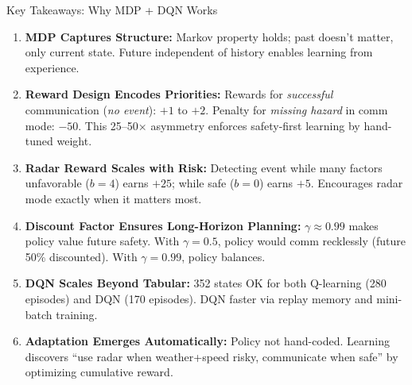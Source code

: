 \documentclass{beamer}
\begin{document}
\begin{frame}{Key Takeaways: Why MDP + DQN Works}
  \begin{enumerate}
    \item \textbf{MDP Captures Structure:} Markov property holds; past doesn't matter, only current state. Future independent of history enables learning from experience.

    \item \textbf{Reward Design Encodes Priorities:} Rewards for \emph{successful} communication (\emph{no event}): $+1$ to $+2$. Penalty for \emph{missing hazard} in comm mode: $-50$. This 25--50× asymmetry enforces safety-first learning by hand-tuned weight.

    \item \textbf{Radar Reward Scales with Risk:} Detecting event while many factors unfavorable ($b=4$) earns $+25$; while safe ($b=0$) earns $+5$. Encourages radar mode exactly when it matters most.

    \item \textbf{Discount Factor Ensures Long-Horizon Planning:} $\gamma \approx 0.99$ makes policy value future safety. With $\gamma=0.5$, policy would comm recklessly (future 50\% discounted). With $\gamma=0.99$, policy balances.

    \item \textbf{DQN Scales Beyond Tabular:} 352 states OK for both Q-learning (280 episodes) and DQN (170 episodes). DQN faster via replay memory and mini-batch training.

    \item \textbf{Adaptation Emerges Automatically:} Policy not hand-coded. Learning discovers ``use radar when weather+speed risky, communicate when safe'' by optimizing cumulative reward.
  \end{enumerate}
\end{frame}
\end{document}
